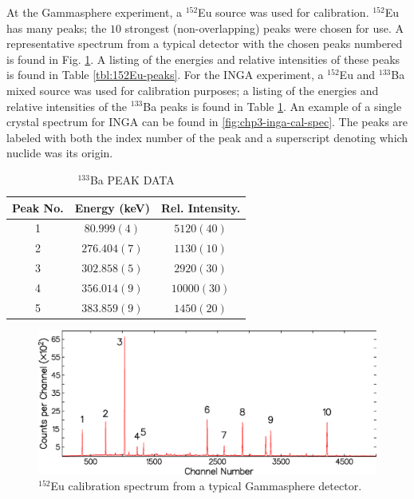 At the Gammasphere experiment, a $^{152}$Eu source was used for calibration. $^{152}$Eu has many peaks; the $10$ strongest (non-overlapping) peaks were chosen for use. A representative spectrum from a typical detector with the chosen peaks numbered is found in Fig. \ref{fig:chp3-gs-cal-spec}.  A listing of the energies and relative intensities of these peaks is found in Table \ref{tbl:152Eu-peaks}. For the INGA experiment, a $^{152}$Eu and $^{133}$Ba mixed source was used for calibration purposes; a listing of the energies and relative intensities of the $^{133}$Ba peaks is found in Table \ref{tbl:133Ba-peaks}. An example of a single crystal spectrum for INGA can be found in \ref{fig:chp3-inga-cal-spec}. The peaks are labeled with both the index number of the peak and a superscript denoting which nuclide was its origin.

\begin{table}[hb!]
\caption{$^{133}$Ba PEAK DATA \label{tbl:133Ba-peaks}}
\begin{center}
\begin{tabular}{ccc}
\toprule
Peak No. & Energy (keV) & Rel. Intensity. \\ 
\midrule
1 & $80.999(4)$ & $5120(40)$ \\ 
2 & $276.404(7)$ & $1130(10)$ \\ 
3 & $302.858(5)$ & $2920(30)$ \\ 
4 & $356.014(9)$ & $10000(30)$ \\ 
5 & $383.859(9)$ & $1450(20)$ \\ 
\bottomrule
\end{tabular} 
\end{center}
\end{table}

\begin{figure}[h!]
	\setlength{\capwidth}{\textwidth}
	\centerline{\includegraphics[height=0.25\textheight]{./img/c3/gs_cal_spec.eps}}
	\caption{$^{152}$Eu calibration spectrum from a typical Gammasphere detector.}
	\label{fig:chp3-gs-cal-spec}
	\setlength{\capwidth}{0.9\textwidth}
\end{figure}

